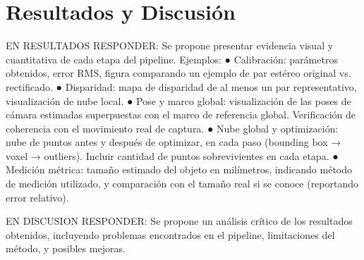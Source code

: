 \documentclass[a4paper,11pt]{article}
\begin{document}
\section{Resultados y Discusión}
EN RESULTADOS RESPONDER:
Se propone presentar evidencia visual y cuantitativa de cada etapa del pipeline.
Ejemplos:
● Calibración: parámetros obtenidos, error RMS, figura comparando un ejemplo de par
estéreo original vs. rectificado.
● Disparidad: mapa de disparidad de al menos un par representativo, visualización de
nube local.
● Pose y marco global: visualización de las poses de cámara estimadas superpuestas
con el marco de referencia global. Verificación de coherencia con el movimiento real
de captura.
● Nube global y optimización: nube de puntos antes y después de optimizar, en cada
paso (bounding box → voxel → outliers). Incluir cantidad de puntos sobrevivientes en
cada etapa.
● Medición métrica: tamaño estimado del objeto en milímetros, indicando método de
medición utilizado, y comparación con el tamaño real si se conoce (reportando error
relativo).

EN DISCUSION RESPONDER:
Se propone un análisis crítico de los resultados obtenidos, incluyendo problemas
encontrados en el pipeline, limitaciones del método, y posibles mejoras.
\end{document}
